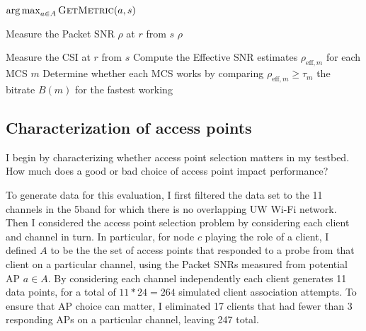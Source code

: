 \begin{algorithm}[tp]
\caption{\label{alg:ap_sel_basic}}
\begin{algorithmic}[1]
\RETURN $\operatorname*{arg\,max}_{a\in A} \textsc{GetMetric}(a, s)$ \hfill {}
\end{algorithmic}
\end{algorithm}
\begin{algorithm}[tp]
\caption{\label{alg:snr_link_metric}}
\begin{algorithmic}[1]
\STATE Measure the Packet SNR $\rho$ at $r$ from $s$
\RETURN $\rho$
\end{algorithmic}
\end{algorithm}
\begin{algorithm}[tp]
\caption{\label{alg:eff_snr_link_metric}}
\begin{algorithmic}[1]
\STATE Measure the CSI at $r$ from $s$ \hfill {}
\STATE Compute the Effective SNR estimates $\rho_{\text{eff},m}$ for each MCS $m$
\STATE Determine whether each MCS works by comparing $\rho_{\text{eff},m} \geq \tau_m$
\RETURN the bitrate $B(m)$ for the fastest working 
\end{algorithmic}
\end{algorithm}

\subsection{Characterization of access points}
I begin by characterizing whether access point selection matters in my testbed. How much does a good or bad choice of access point impact performance?

To generate data for this evaluation, I first filtered the data set to the 11 channels in the 5\GHz band for which there is no overlapping UW Wi-Fi network. Then I considered the access point selection problem by considering each client and channel in turn. In particular, for node $c$ playing the role of a client, I defined $A$ to be the the set of access points that responded to a probe from that client on a particular channel, using the Packet SNRs measured from potential AP $a \in A$. By considering each channel independently each client generates 11 data points, for a total of $11*24=264$ simulated client association attempts. To ensure that AP choice can matter, I eliminated 17 clients that had fewer than 3 responding APs on a particular channel, leaving 247 total.

